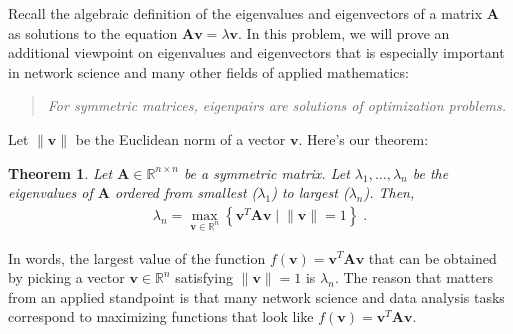 \documentclass[11pt]{article}
\newtheorem{thm}{Theorem}
\begin{document}
\begin{tcolorbox}[title = 4. Eigenpairs of symmetric matrices and optimization]
Recall the algebraic definition of the eigenvalues and eigenvectors of a matrix $\mathbf{A}$ as solutions to the equation $\mathbf{A}\mathbf{v} = \lambda \mathbf{v}$. 
In this problem, we will prove an additional viewpoint on eigenvalues and eigenvectors that is especially important in network science and many other fields of applied mathematics: 
\begin{quote}
    \emph{For symmetric matrices, eigenpairs are solutions of optimization problems.} 
\end{quote}
Let $\lVert\mathbf{v} \rVert$ be the Euclidean norm of a vector $\mathbf{v}$. 
Here's our theorem: 
\begin{thm} \label{thm:variational}
    Let $\mathbf{A} \in \mathbb{R}^{n\times n}$ be a symmetric matrix. 
    Let $\lambda_1,\ldots,\lambda_n$ be the eigenvalues of $\mathbf{A}$ ordered from smallest ($\lambda_1$) to largest ($\lambda_n$).  
    Then, 
    \begin{align*}
        \lambda_n = \max_{\mathbf{v} \in \mathbb{R}^n} \left\{\mathbf{v}^T\mathbf{A}\mathbf{v} \;\big|\; \lVert{\mathbf{v}}\rVert = 1\right\} \;.
    \end{align*}
\end{thm}
In words, the largest value of the function $f(\mathbf{v}) = \mathbf{v}^T\mathbf{A}\mathbf{v}$ that can be obtained by picking a vector $\mathbf{v} \in \mathbb{R}^n$ satisfying $\lVert \mathbf{v} \rVert = 1$ is $\lambda_n$. 
The reason that  matters from an applied standpoint is that many network science and data analysis tasks correspond to maximizing functions that look like $f(\mathbf{v}) = \mathbf{v}^T\mathbf{A}\mathbf{v}$.  


\end{tcolorbox}
\end{document}
